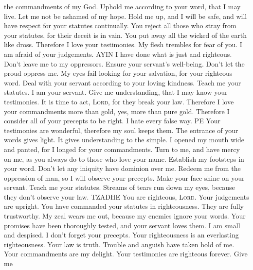 the commandments of my God.  Uphold me according to your
word, that I may live. Let me not be ashamed of my hope.
 Hold me up, and I will be safe, and will have respect
for your statutes continually.  You reject all those who
stray from your statutes, for their deceit is in vain. 
You put away all the wicked of the earth like dross. Therefore I love
your testimonies.  My flesh trembles for fear of you. I
am afraid of your judgements. AYIN  I have done what is
just and righteous. Don't leave me to my oppressors. 
Ensure your servant's well-being. Don't let the proud oppress me.
 My eyes fail looking for your salvation, for your
righteous word.  Deal with your servant according to
your loving kindness. Teach me your statutes.  I am your
servant. Give me understanding, that I may know your testimonies.
 It is time to act, \textsc{Lord}, for they break your
law.  Therefore I love your commandments more than gold,
yes, more than pure gold.  Therefore I consider all of
your precepts to be right. I hate every false way. PE 
Your testimonies are wonderful, therefore my soul keeps them.
 The entrance of your words gives light. It gives
understanding to the simple.  I opened my mouth wide and
panted, for I longed for your commandments.  Turn to me,
and have mercy on me, as you always do to those who love your name.
 Establish my footsteps in your word. Don't let any
iniquity have dominion over me.  Redeem me from the
oppression of man, so I will observe your precepts. 
Make your face shine on your servant. Teach me your statutes.
 Streams of tears run down my eyes, because they don't
observe your law. TZADHE  You are righteous,
\textsc{Lord}. Your judgements are upright.  You have
commanded your statutes in righteousness. They are fully trustworthy.
 My zeal wears me out, because my enemies ignore your
words.  Your promises have been thoroughly tested, and
your servant loves them.  I am small and despised. I
don't forget your precepts.  Your righteousness is an
everlasting righteousness. Your law is truth.  Trouble
and anguish have taken hold of me. Your commandments are my delight.
 Your testimonies are righteous forever. Give me
